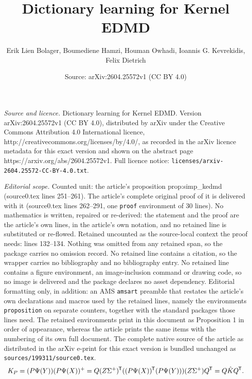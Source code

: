 \documentclass[10pt,a4paper]{amsart}
\title{Dictionary learning for Kernel EDMD}
\author{Erik Lien Bolager, Boumediene Hamzi, Houman Owhadi, Ioannis G. Kevrekidis, Felix Dietrich}
\date{Source: arXiv:2604.25572v1 (CC BY 4.0)}
\newcommand*{\tran}{^{\mkern-1.5mu\mathsf{T}}} %
\begin{document}
\maketitle

\noindent\emph{Source and licence.} Dictionary learning for Kernel EDMD. Version arXiv:2604.25572v1 (CC BY 4.0), distributed by arXiv under the Creative Commons Attribution 4.0 International licence, http://creativecommons.org/licenses/by/4.0/, as recorded in the arXiv licence metadata for this exact version and shown on the abstract page https://arxiv.org/abs/2604.25572v1. Full licence notice: \texttt{licenses/arxiv-2604.25572-CC-BY-4.0.txt}.\par\smallskip

\noindent\textit{Editorial scope.} Counted unit: the article's proposition prop:simp\_kedmd (source0.tex lines 251--261). The article's complete original proof of it is delivered with it (source0.tex lines 262--291, one \texttt{proof} environment of 30 lines). No mathematics is written, repaired or re-derived: the statement and the proof are the article's own lines, in the article's own notation, and no retained line is substituted or re-flowed.  Retained uncounted as the source-local context the proof needs: lines 132--134.  Nothing was omitted from any retained span, so the package carries no omission record.  No retained line contains a citation, so the wrapper carries no bibliography and no bibliography entry.  No retained line contains a figure environment, an image-inclusion command or drawing code, so no image is delivered and the package declares no asset dependency.  Editorial formatting only, in addition: an AMS \texttt{amsart} preamble that restates the article's own declarations and macros used by the retained lines, namely the environments \texttt{proposition} on separate counters, together with the standard packages those lines need.  The retained environments print in this document as Proposition 1 in order of appearance, whereas the article prints the same items with the numbering of its own full document.  The complete native source of the article as distributed in the arXiv e-print for this exact version is bundled unchanged as \texttt{sources/199311/source0.tex}.
\begin{align}\label{eq:def_khat}
    K_P = (P\Psi(Y))(P\Psi(X))^+ = Q(Z\Sigma^+)\tran ((P\Psi(X))\tran (P\Psi(Y))) (Z\Sigma^+) Q\tran = Q \Hat K Q\tran.
\end{align}
\end{document}
